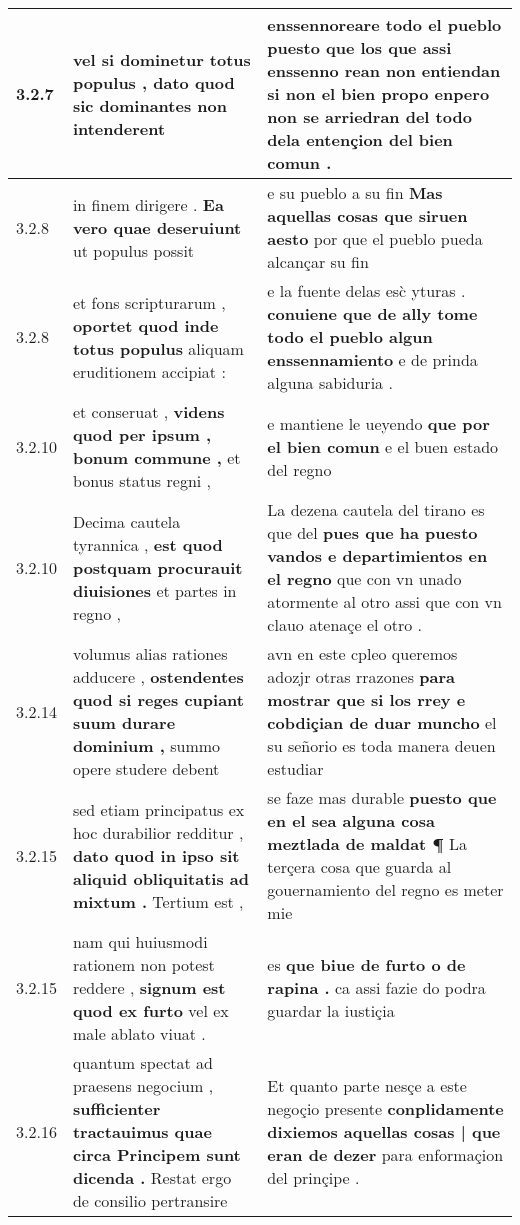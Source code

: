 \begin{tabular}{|p{1cm}|p{6.5cm}|p{6.5cm}|}
3.2.7 & vel si dominetur totus populus , \textbf{ dato quod sic dominantes } non intenderent & enssennoreare todo el pueblo \textbf{ puesto que los que assi enssenno rean non entiendan } si non el bien propo enpero non se arriedran del todo dela entençion del bien comun . \\\hline
3.2.8 & in finem dirigere . \textbf{ Ea vero quae deseruiunt } ut populus possit & e su pueblo a su fin \textbf{ Mas aquellas cosas que siruen aesto } por que el pueblo pueda alcançar su fin \\\hline
3.2.8 & et fons scripturarum , \textbf{ oportet quod inde totus populus } aliquam eruditionem accipiat : & e la fuente delas esc̀ yturas . \textbf{ conuiene que de ally tome todo el pueblo algun enssennamiento } e de prinda alguna sabiduria . \\\hline
3.2.10 & et conseruat , \textbf{ videns quod per ipsum , bonum commune , } et bonus status regni , & e mantiene le ueyendo \textbf{ que por el bien comun } e el buen estado del regno \\\hline
3.2.10 & Decima cautela tyrannica , \textbf{ est quod postquam procurauit diuisiones } et partes in regno , & La dezena cautela del tirano es que del \textbf{ pues que ha puesto vandos e departimientos en el regno } que con vn unado atormente al otro assi que con vn clauo atenaçe el otro . \\\hline
3.2.14 & volumus alias rationes adducere , \textbf{ ostendentes quod si reges cupiant suum durare dominium , } summo opere studere debent & avn en este cpleo queremos adozjr otras rrazones \textbf{ para mostrar que si los rrey e cobdiçian de duar muncho } el su señorio es toda manera deuen estudiar \\\hline
3.2.15 & sed etiam principatus ex hoc durabilior redditur , \textbf{ dato quod in ipso sit aliquid obliquitatis ad mixtum . } Tertium est , & se faze mas durable \textbf{ puesto que en el sea alguna cosa meztlada de maldat ¶ } La terçera cosa que guarda al gouernamiento del regno es meter mie \\\hline
3.2.15 & nam qui huiusmodi rationem non potest reddere , \textbf{ signum est quod ex furto } vel ex male ablato viuat . & es \textbf{ que biue de furto o de rapina . } ca assi fazie do podra guardar la iustiçia \\\hline
3.2.16 & quantum spectat ad praesens negocium , \textbf{ sufficienter tractauimus quae circa Principem sunt dicenda . } Restat ergo de consilio pertransire & Et quanto parte nesçe a este negoçio presente \textbf{ conplidamente dixiemos aquellas cosas | que eran de dezer } para enformaçion del prinçipe . \\\hline

\end{tabular}
